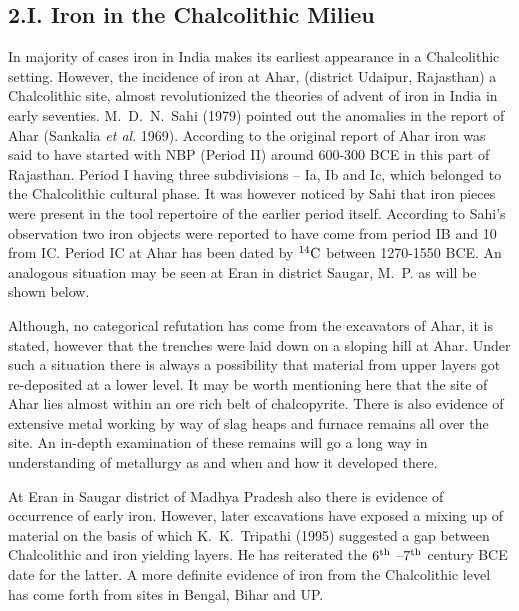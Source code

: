 \vspace{-.48cm}

\subsection*{2.I. Iron in the Chalcolithic Milieu}\label{chapter3-subsection-4}

\vspace{-.2cm}

In majority of cases iron in India makes its earliest appearance in a Chalcolithic setting. However, the incidence of iron at Ahar, (district Udaipur, Rajasthan) a Chalcolithic site, almost revolutionized the theories of advent of iron in India in early seventies. M.~D.~N.~Sahi (1979) pointed out the anomalies in the report of Ahar (Sankalia \textit{et al}. 1969). According to the original report of Ahar iron was said to have started with NBP (Period II) around 600-300 BCE in this part of Rajasthan. Period I having three subdivisions – Ia, Ib and Ic, which belonged to the Chalcolithic cultural phase. It was however noticed by Sahi that iron pieces were present in the tool repertoire of the earlier period itself. According to Sahi’s observation two iron objects were reported to have come from period IB and 10 from IC. Period IC at Ahar has been dated by $^{14}{\rm C}$ between 1270-1550 BCE. An analogous situation may be seen at Eran in district Saugar, M.~P. as will be shown below.

Although, no categorical refutation has come from the excavators of Ahar, it is stated, however that the trenches were laid down on a sloping hill at Ahar. Under such a situation there is always a possibility that material from upper layers got re-deposited at a lower level. It may be worth mentioning here that the site of Ahar lies almost within an ore rich belt of chalcopyrite. There is also evidence of extensive metal working by way of slag heaps and furnace remains all over the site. An in-depth examination of these remains will go a long way in understanding of metallurgy as and when and how it developed there.

At Eran in Saugar district of Madhya Pradesh also there is evidence of occurrence of early iron. However, later excavations have exposed a mixing up of material on the basis of which K.~K.~Tripathi (1995) suggested a gap between Chalcolithic and iron yielding layers. He has reiterated the $6^{\rm th}$ –$7^{\rm th}$ century BCE date for the latter. A more definite evidence of iron from the Chalcolithic level has come forth from sites in Bengal, Bihar and UP.

